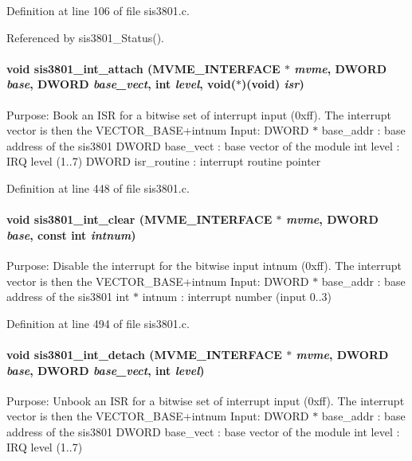 Definition at line 106 of file sis3801.c.

Referenced by sis3801\_\-Status().
\paragraph[{sis3801\_\-int\_\-attach}]{\setlength{\rightskip}{0pt plus 5cm}void sis3801\_\-int\_\-attach ({\bf MVME\_\-INTERFACE} $\ast$ {\em mvme}, \/  {\bf DWORD} {\em base}, \/  {\bf DWORD} {\em base\_\-vect}, \/  int {\em level}, \/  void($\ast$)(void) {\em isr})}\hfill\label{sis3801_8c_a7f43596a68de1d6fa6abe790cc58ca70}
Purpose: Book an ISR for a bitwise set of interrupt input (0xff). The interrupt vector is then the VECTOR\_\-BASE+intnum Input: DWORD $\ast$ base\_\-addr : base address of the sis3801 DWORD base\_\-vect : base vector of the module int level : IRQ level (1..7) DWORD isr\_\-routine : interrupt routine pointer 

Definition at line 448 of file sis3801.c.
\paragraph[{sis3801\_\-int\_\-clear}]{\setlength{\rightskip}{0pt plus 5cm}void sis3801\_\-int\_\-clear ({\bf MVME\_\-INTERFACE} $\ast$ {\em mvme}, \/  {\bf DWORD} {\em base}, \/  const int {\em intnum})}\hfill\label{sis3801_8c_a9b524fa0921f6b80326dc3f94307e8be}
Purpose: Disable the interrupt for the bitwise input intnum (0xff). The interrupt vector is then the VECTOR\_\-BASE+intnum Input: DWORD $\ast$ base\_\-addr : base address of the sis3801 int $\ast$ intnum : interrupt number (input 0..3) 

Definition at line 494 of file sis3801.c.
\paragraph[{sis3801\_\-int\_\-detach}]{\setlength{\rightskip}{0pt plus 5cm}void sis3801\_\-int\_\-detach ({\bf MVME\_\-INTERFACE} $\ast$ {\em mvme}, \/  {\bf DWORD} {\em base}, \/  {\bf DWORD} {\em base\_\-vect}, \/  int {\em level})}\hfill\label{sis3801_8c_afba204e4b4b5d65ed9ad844f61cd6e5f}
Purpose: Unbook an ISR for a bitwise set of interrupt input (0xff). The interrupt vector is then the VECTOR\_\-BASE+intnum Input: DWORD $\ast$ base\_\-addr : base address of the sis3801 DWORD base\_\-vect : base vector of the module int level : IRQ level (1..7) 

